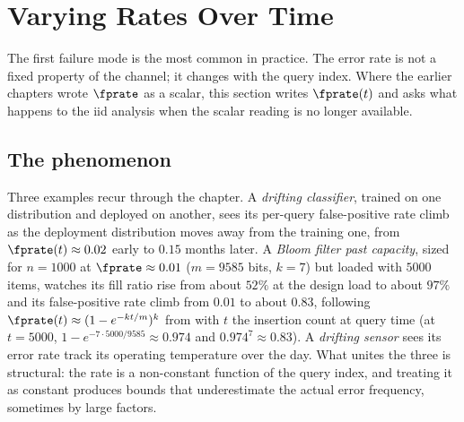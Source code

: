 %

\section{Varying Rates Over Time}
\label{sec:varying-rates}

The first failure mode is the most common in practice. The error rate is
not a fixed property of the channel; it changes with the query index.
Where the earlier chapters wrote $\fprate$ as a scalar, this section
writes $\fprate(t)$ and asks what happens to the iid analysis when the
scalar reading is no longer available.

\subsection*{The phenomenon}

Three examples recur through the chapter. A \emph{drifting classifier},
trained on one distribution and deployed on another, sees its per-query
false-positive rate climb as the deployment distribution moves away from
the training one, from $\fprate(t) \approx 0.02$ early to $0.15$ months
later. A \emph{Bloom filter past capacity}, sized for $n = 1000$ at
$\fprate \approx 0.01$ ($m = 9585$ bits, $k = 7$) but loaded with $5000$
items, watches its fill ratio rise from about $52\%$ at the design load
to about $97\%$ and its false-positive rate climb from $0.01$ to about
$0.83$, following $\fprate(t) \approx (1 - e^{-kt/m})^k$ from
 with $t$ the insertion count at query time
(at $t = 5000$, $1 - e^{-7 \cdot 5000/9585} \approx 0.974$ and $0.974^7
\approx 0.83$). A \emph{drifting sensor} sees its error rate track
its operating temperature over the day. What unites the three is
structural: the rate is a non-constant function of the query index, and
treating it as constant produces bounds that underestimate the actual
error frequency, sometimes by large factors.

